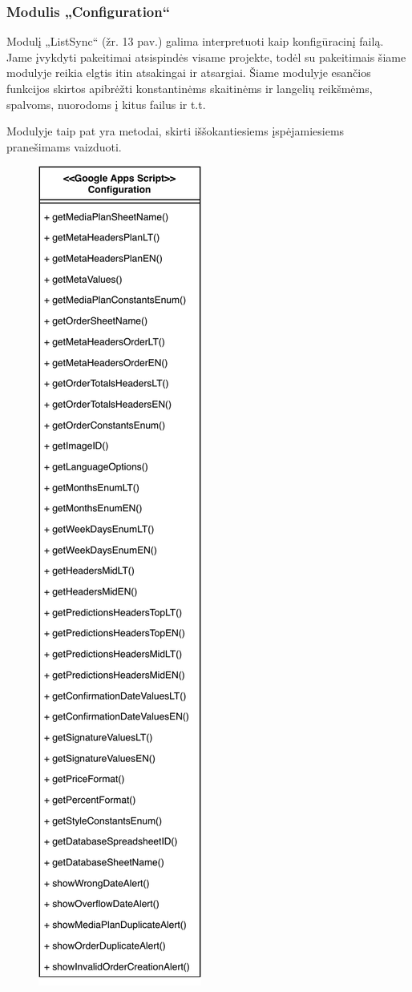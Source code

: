 \subsubsection{Modulis „Configuration“}
Modulį „ListSync“ (žr. 13 pav.) galima interpretuoti kaip konfigūracinį failą. Jame įvykdyti pakeitimai atsispindės visame projekte, todėl su pakeitimais šiame modulyje reikia elgtis itin atsakingai ir atsargiai. Šiame modulyje esančios funkcijos skirtos apibrėžti konstantinėms skaitinėms ir langelių reikšmėms, spalvoms, nuorodoms į kitus failus ir t.t.

Modulyje taip pat yra metodai, skirti iššokantiesiems įspėjamiesiems pranešimams vaizduoti.

\begin{figure}[H]
    \centering
    \includegraphics[scale=0.5]{Images/module-configuration.pdf}

\end{figure}
